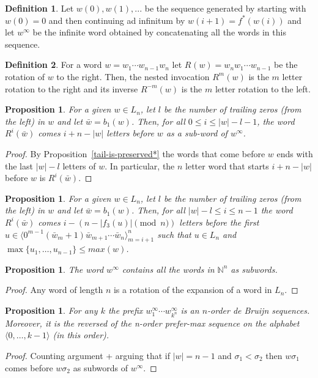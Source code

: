 \documentclass{article}
\newtheorem{proposition}[theorem]{Proposition}
\theoremstyle{definition}
\newtheorem{definition}{Definition}
\newcommand{\N}{{\mathbb{N}}}
\newcommand{\T}[1]{\langle{#1}\rangle}
\newcommand{\rr}[2]{R^{#2}({#1})}
\newcommand{\rl}[2]{R^{-{#2}}({#1})}
\begin{document}
\begin{definition}
	Let $w(0),w(1),...$ be the sequence generated by starting with $w(0)=0$ and then continuing ad infinitum by $w{(i+1)}=f^*(w(i))$ and let $w^\infty$ be the infinite word obtained by concatenating all the words in this sequence.
\end{definition}


\begin{definition}
	For a word $w=w_1\cdots w_{n-1}w_n$ let  $\rr{w}{}= w_{n}w_1\cdots w_{n-1}$ be the rotation of $w$ to the right. Then, the nested invocation $\rr{w}{m}$ is the $m$ letter rotation to the right and its inverse $\rl{w}{m}$ is the $m$ letter rotation to the left.
\end{definition}

\begin{proposition}\label{simple-pos}
	For a given $w \in L_n$, let $l$ be the number of trailing zeros (from the left) in $w$ and let $\bar{w}=b_1(w)$. Then, for all $0 \leq i \leq |w|-l-1$, the word $\rr{\bar{w}}{i}$ comes $i+n-|w|$ letters before $w$ as a sub-word of $w^\infty$.
\end{proposition}
\begin{proof}
	By Proposition~\ref{tail-is-preserved*} the words that come before $w$ ends with the last $|w|-l$ letters of $w$. In particular, the $n$ letter word that starts $i+n-|w|$ before $w$ is $\rr{\bar{w}}{i}$.
\end{proof}

\begin{proposition}\label{advanced-pos}
	For a given $w \in L_n$, let $l$ be the number of trailing zeros (from the left) in $w$ and let $\bar{w}=b_1(w)$. Then, for all $|w|-l \leq i \leq n-1$ the word $\rr{\bar{w}}{i}$ comes $i-(n-|f_3(u)| \pmod n)$ letters before the first $u \in \T{0^{m-1} (\bar{w}_{m} + 1) \bar{w}_{m+1}\cdots \bar{w}_n}_{m=i+1}^{n}$ such that $u \in L_n$ and  $\max\{u_1,\dots,u_{n-1}\} \leq max(w)$.
\end{proposition}


\begin{proposition}
	The word $w^\infty$ contains all the words in $\N^n$ as subwords.
\end{proposition}
\begin{proof}
	Any word of length $n$ is a rotation of the expansion of a word in $L_n$.
\end{proof}


\begin{proposition}
	For any $k$ the prefix $w^\infty_1 \cdots w^\infty_{k^n}$ is an $n$-order de Bruijn sequences. Moreover, it is the reversed of the n-order prefer-max sequence on the alphabet $\T{0,\dots,k-1}$ (in this order). 
\end{proposition}
\begin{proof}
	Counting argument + arguing that if $|w| =n-1$ and $\sigma_1 < \sigma_2$ then $w\sigma_1$ comes before $w\sigma_2$ as subwords of $w^\infty$.
\end{proof}
\end{document}
